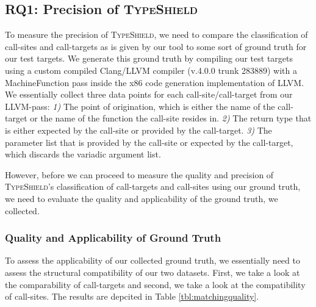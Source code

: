 \subsection{RQ1: Precision of \textsc{TypeShield}}
\label{section:typeshieldprecision}

To measure the precision of \textsc{TypeShield}, we need to compare the classification of call-sites and call-targets as is given by our tool to
some sort of ground truth for our test targets. We generate this ground truth by compiling our test targets using a custom compiled Clang/LLVM
compiler (v.4.0.0 trunk 283889) with a MachineFunction pass inside the x86 code generation implementation of LLVM. We essentially 
collect three data points for each call-site/call-target from our LLVM-pass:
\textit{1)} The point of origination, which is either the name of the call-target or the name of the function the call-site resides in.
\textit{2)} The return type that is either expected by the call-site or provided by the call-target.
\textit{3)} The parameter list that is provided by the call-site or expected by the call-target, which discards the variadic argument list.

However, before we can proceed to measure the quality and precision of \textsc{TypeShield}'s classification of call-targets and call-sites
using our ground truth, we need to evaluate the quality and applicability of the ground truth, we collected.

\subsubsection{Quality and Applicability of Ground Truth}
\label{subsection:typeshieldprecision}
To assess the applicability of our collected ground truth, we essentially need to assess the structural compatibility of our two datasets.
First, we take a look at the comparability of call-targets and second, we take a look at the compatibility of call-sites. The results are depcited in Table \ref{tbl:matchingquality}.

